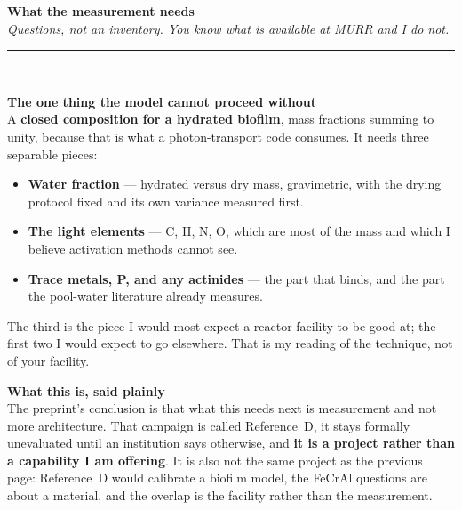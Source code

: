 \documentclass[landscape,12pt]{article}
\newcommand{\pagehead}[2]{%
  {\Large\bfseries #1}\\[1pt]
  {\small\itshape #2}\\[-4pt]
  \rule{\linewidth}{0.6pt}\\[4pt]}
\begin{document}
\newpage
\pagehead{What the measurement needs}%
{Questions, not an inventory. You know what is available at MURR and I do not.}

\vspace{2mm}
\begin{minipage}[t]{0.45\linewidth}
{\large\bfseries\color{bench} The one thing the model cannot proceed without}\\[3pt]
A \textbf{closed composition for a hydrated biofilm}, mass fractions summing to unity, because
that is what a photon-transport code consumes. It needs three separable pieces:

\begin{itemize}
  \item \textbf{Water fraction} --- hydrated versus dry mass, gravimetric, with the drying
        protocol fixed and its own variance measured first.
  \item \textbf{The light elements} --- C, H, N, O, which are most of the mass and which I
        believe activation methods cannot see.
  \item \textbf{Trace metals, P, and any actinides} --- the part that binds, and the part the
        pool-water literature already measures.
\end{itemize}

\vspace{2mm}
The third is the piece I would most expect a reactor facility to be good at; the first two I would
expect to go elsewhere. That is my reading of the technique, not of your facility.

\vspace{3mm}
{\large\bfseries\color{phys} What this is, said plainly}\\[3pt]
The preprint's conclusion is that what this needs next is measurement and not more architecture.
That campaign is called Reference~D, it stays formally unevaluated until an institution says
otherwise, and \textbf{it is a project rather than a capability I am offering}. It is also not the
same project as the previous page: Reference~D would calibrate a biofilm model, the FeCrAl questions
are about a material, and the overlap is the facility rather than the measurement.

\end{minipage}\hfill
\end{document}
